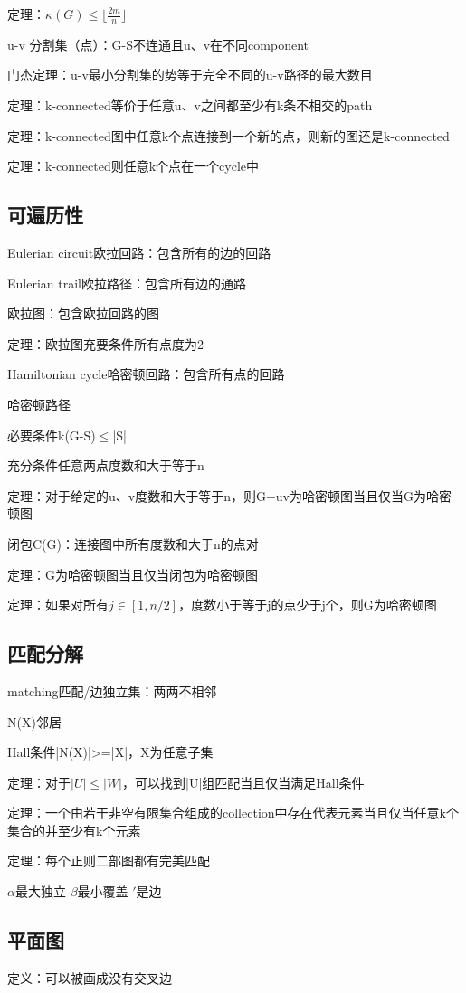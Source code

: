 \documentclass[cn,hazy,blue,screen,14pt]{note}
\begin{document}
定理：$\kappa(G)\leq \lfloor\frac{2m}{n} \rfloor$

u-v 分割集（点）：G-S不连通且u、v在不同component


门杰定理：u-v最小分割集的势等于完全不同的u-v路径的最大数目

定理：k-connected等价于任意u、v之间都至少有k条不相交的path

定理：k-connected图中任意k个点连接到一个新的点，则新的图还是k-connected

定理：k-connected则任意k个点在一个cycle中

\subsection{可遍历性}
Eulerian circuit欧拉回路：包含所有的边的回路

Eulerian trail欧拉路径：包含所有边的通路

欧拉图：包含欧拉回路的图

定理：欧拉图充要条件所有点度为2

Hamiltonian cycle哈密顿回路：包含所有点的回路

哈密顿路径

必要条件k(G-S)$\leq$|S|

充分条件任意两点度数和大于等于n

定理：对于给定的u、v度数和大于等于n，则G+uv为哈密顿图当且仅当G为哈密顿图

闭包C(G)：连接图中所有度数和大于n的点对

定理：G为哈密顿图当且仅当闭包为哈密顿图

定理：如果对所有$j\in [1,n/2]$，度数小于等于j的点少于j个，则G为哈密顿图


\subsection{匹配分解}
matching匹配/边独立集：两两不相邻

N(X)邻居

Hall条件|N(X)|>=|X|，X为任意子集

定理：对于$|U|\leq |W|$，可以找到|U|组匹配当且仅当满足Hall条件

定理：一个由若干非空有限集合组成的collection中存在代表元素当且仅当任意k个集合的并至少有k个元素

定理：每个正则二部图都有完美匹配

$\alpha$最大独立 $\beta$最小覆盖 $'$是边
\subsection{平面图}
定义：可以被画成没有交叉边
\end{document}
